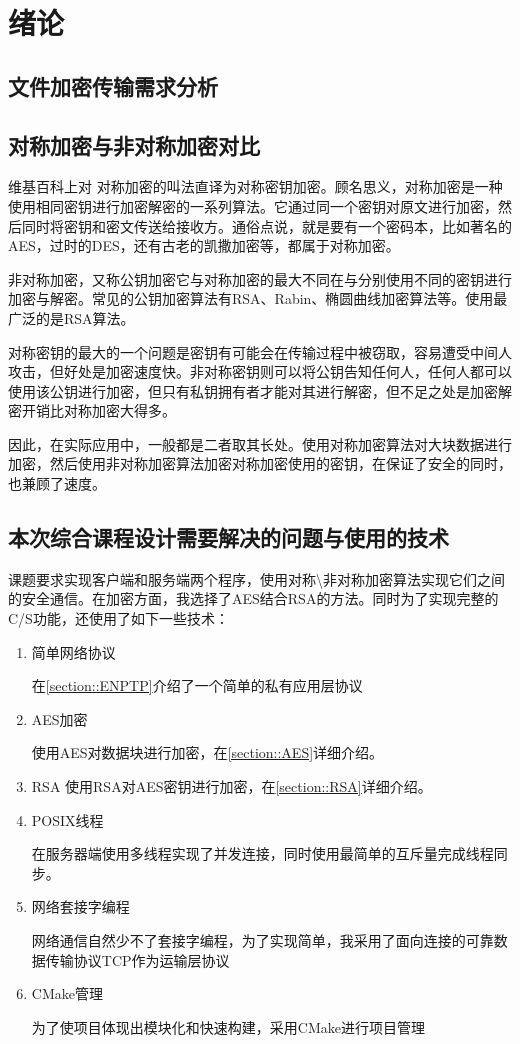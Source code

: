 
\chapter{绪论}
\label{Chapter::one}
\section{文件加密传输需求分析}

\section{对称加密与非对称加密对比}
维基百科上对 对称加密的叫法直译为对称密钥加密。顾名思义，对称加密是一种使用相同密钥进行加密解密的一系列算法。它通过同一个密钥对原文进行加密，然后同时将密钥和密文传送给接收方。通俗点说，就是要有一个密码本，比如著名的AES，过时的DES，还有古老的凯撒加密等，都属于对称加密。

非对称加密，又称公钥加密它与对称加密的最大不同在与分别使用不同的密钥进行加密与解密。常见的公钥加密算法有RSA、Rabin、椭圆曲线加密算法等。使用最广泛的是RSA算法。

对称密钥的最大的一个问题是密钥有可能会在传输过程中被窃取，容易遭受中间人攻击，但好处是加密速度快。非对称密钥则可以将公钥告知任何人，任何人都可以使用该公钥进行加密，但只有私钥拥有者才能对其进行解密，但不足之处是加密解密开销比对称加密大得多。

因此，在实际应用中，一般都是二者取其长处。使用对称加密算法对大块数据进行加密，然后使用非对称加密算法加密对称加密使用的密钥，在保证了安全的同时，也兼顾了速度。

\section{本次综合课程设计需要解决的问题与使用的技术}
课题要求实现客户端和服务端两个程序，使用对称\textbackslash 非对称加密算法实现它们之间的安全通信。在加密方面，我选择了AES结合RSA的方法。同时为了实现完整的C/S功能，还使用了如下一些技术：
\begin{enumerate}
\item 简单网络协议

在\ref{section::ENPTP}介绍了一个简单的私有应用层协议
\item AES加密

使用AES对数据块进行加密，在\ref{section::AES}详细介绍。
\item RSA
使用RSA对AES密钥进行加密，在\ref{section::RSA}详细介绍。

\item POSIX线程

在服务器端使用多线程实现了并发连接，同时使用最简单的互斥量完成线程同步。
\item 网络套接字编程

网络通信自然少不了套接字编程，为了实现简单，我采用了面向连接的可靠数据传输协议TCP作为运输层协议
\item CMake管理

为了使项目体现出模块化和快速构建，采用CMake进行项目管理
\end{enumerate}

